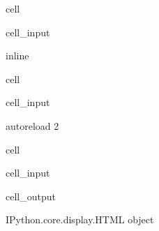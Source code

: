 \documentclass[letterpaper,10pt,english]{jupyterBook}
\begin{document}
\begin{sphinxuseclass}{cell}\begin{sphinxVerbatimInput}

\begin{sphinxuseclass}{cell_input}
\begin{sphinxVerbatim}[commandchars=\\\{\}]
 inline
\end{sphinxVerbatim}

\end{sphinxuseclass}\end{sphinxVerbatimInput}

\end{sphinxuseclass}
\begin{sphinxuseclass}{cell}\begin{sphinxVerbatimInput}

\begin{sphinxuseclass}{cell_input}
\begin{sphinxVerbatim}[commandchars=\\\{\}]
  autoreload
  2
\end{sphinxVerbatim}

\end{sphinxuseclass}\end{sphinxVerbatimInput}

\end{sphinxuseclass}
\begin{sphinxuseclass}{cell}\begin{sphinxVerbatimInput}

\begin{sphinxuseclass}{cell_input}
\begin{sphinxVerbatim}[commandchars=\\\{\}]
    
   
\end{sphinxVerbatim}

\end{sphinxuseclass}\end{sphinxVerbatimInput}
\begin{sphinxVerbatimOutput}

\begin{sphinxuseclass}{cell_output}
\begin{sphinxVerbatim}[commandchars=\\\{\}]
\PYGZlt{}IPython.core.display.HTML object\PYGZgt{}
\end{sphinxVerbatim}

\end{sphinxuseclass}\end{sphinxVerbatimOutput}

\end{sphinxuseclass}
\end{document}
